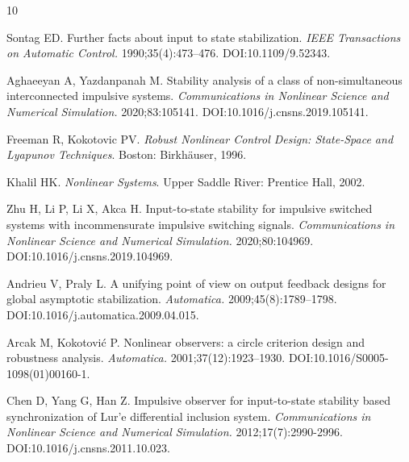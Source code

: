 \documentclass[onecolumn]{autart}
\newenvironment{proof of Prop.ODE}{{\it Proof of Proposition~\ref{Prop.ODE}:\enspace}}{\hfill $\blacksquare$\par}
\newenvironment{proof of PDE}{{\it Proof of Proposition \ref{Prop.8}:\enspace}}{\hfill $\blacksquare$\par}
\begin{document}
{{%






\begin{thebibliography}{10}
	\providecommand \doibase [0]{http://dx.doi.org/}%
	
	Sontag ED. Further facts about input to state stabilization. {\it IEEE
		Transactions on Automatic Control.} 1990\string;35(4)\string:473--476.
	\newblock DOI:10.1109/9.52343.
	
	Aghaeeyan A, Yazdanpanah M. Stability analysis of a class of non-simultaneous
	interconnected impulsive systems. {\it Communications in Nonlinear Science
		and Numerical Simulation.} 2020\string;83\string:105141.
	\newblock DOI:10.1016/j.cnsns.2019.105141.
	
	Freeman R, Kokotovic PV. {\it Robust Nonlinear Control Design: {State-Space}
		and {Lyapunov} Techniques}.
	\newblock Boston: Birkh{\"a}user, 1996.
	
	Khalil HK. {\it Nonlinear Systems}.
	\newblock Upper Saddle River: Prentice Hall, 2002.
	
	Zhu H, Li P, Li X, Akca H. Input-to-state stability for impulsive switched
	systems with incommensurate impulsive switching signals. {\it Communications
		in Nonlinear Science and Numerical Simulation.} 2020\string;80\string:104969.
	\newblock DOI:10.1016/j.cnsns.2019.104969.
	
	Andrieu V, Praly L. A unifying point of view on output feedback designs for
	global asymptotic stabilization. {\it Automatica.}
	2009\string;45(8)\string:1789--1798.
	\newblock DOI:10.1016/j.automatica.2009.04.015.
	
	Arcak M, Kokotovi{\'c} P. Nonlinear observers: a circle criterion design and
	robustness analysis. {\it Automatica.} 2001\string;37(12)\string:1923--1930.
	\newblock DOI:10.1016/S0005-1098(01)00160-1.
	
	Chen D, Yang G, Han Z. Impulsive observer for input-to-state stability based
	synchronization of Lur'e differential inclusion system. {\it Communications
		in Nonlinear Science and Numerical Simulation.}
	2012\string;17(7)\string:2990-2996.
	\newblock DOI:10.1016/j.cnsns.2011.10.023.
	

\end{thebibliography}}}
\end{document}

